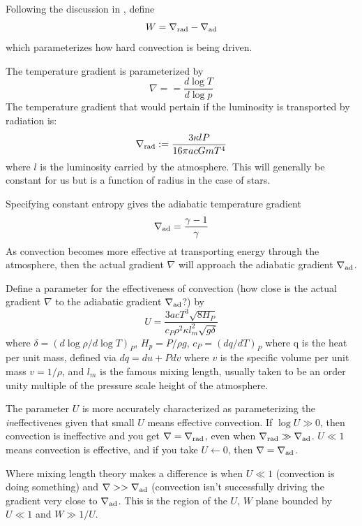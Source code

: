 \documentclass{emulateapj}
\newcommand{\nablaAd}{\nabla_{\rm ad}}
\newcommand{\nablaRad}{\nabla_{\rm rad}}
\begin{document}
Following the discussion in \citet{kippenhahn+weigert1990}, define 
\begin{equation}
W = \nablaRad - \nablaAd
\end{equation}
which parameterizes how hard convection is being driven.  

The temperature gradient is parameterized by 
\begin{equation}
  \nabla = = \frac{d\log T}{d\log p}
\end{equation}
The temperature gradient that would pertain if the luminosity is
transported by radiation is:
\begin{equation}
  \nablaRad := 
\frac{3 \kappa l P}
{16 \pi a c G m T^4}
\end{equation}
where $l$ is the luminosity carried by the atmosphere.  This will
generally be constant for us but is a function of radius in the case
of stars.

Specifying constant entropy gives the adiabatic temperature gradient
\begin{equation}
  \nablaAd = \frac{\gamma-1}{\gamma}
\end{equation}
As convection becomes more effective at transporting energy through the
atmosphere, then the actual gradient $\nabla$ will approach the
adiabatic gradient $\nablaAd$.  

Define a parameter for the effectiveness of convection (how close is
the actual gradient $\nabla $ to the adiabatic
gradient $\nablaAd$?) by
\begin{equation}
  U = \frac{3 a c T^3 \sqrt{8 H_P}}
  {c_P \rho^2 \kappa l_m^2 \sqrt{ g \delta}}
\end{equation}
where $\delta = (d \log \rho / d \log T)_P$, $H_p = P/\rho g$, $c_P =
(dq/dT)_P$ where q is the heat per unit mass, defined via $dq = du + P
dv$ where $v$ is the specific volume per unit mass $v = 1/\rho$, and
$l_m$ is the famous mixing length, usually taken to be an order unity
multiple of the pressure scale height of the atmosphere.

The parameter $U$ is more accurately characterized as parameterizing
the \textit{in}effectivenes given that small $U$ means effective
convection.  If $\log U \gg 0$, then convection is ineffective and you
get $\nabla = \nablaRad$, even when $\nablaRad \gg \nablaAd$.  $U \ll
1 $ means convection is effective, and if you take $U \leftarrow 0$,
then $\nabla = \nablaAd$.

Where mixing length theory makes a difference is when $U \ll 1$
(convection is doing something) and $\nabla >> \nablaAd$ (convection
isn't successfully driving the gradient very close to $\nablaAd$.
This is the region of the $U$, $W$ plane bounded by $U \ll 1$ and $W
\gg 1/U$.  
\end{document}
